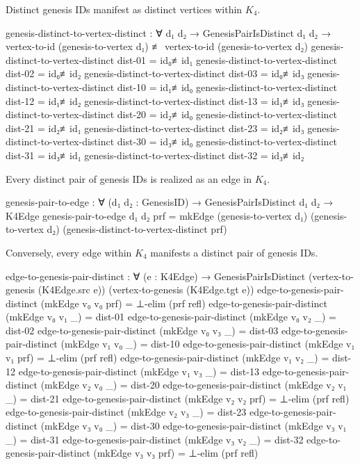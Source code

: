 \documentclass[11pt,a4paper]{book}
\begin{document}
Distinct genesis IDs manifest as distinct vertices within $K_4$.

\begin{code}
genesis-distinct-to-vertex-distinct : ∀ {d₁ d₂} → GenesisPairIsDistinct d₁ d₂ → 
  vertex-to-id (genesis-to-vertex d₁) ≢ vertex-to-id (genesis-to-vertex d₂)
genesis-distinct-to-vertex-distinct dist-01 = id₀≢id₁
genesis-distinct-to-vertex-distinct dist-02 = id₀≢id₂
genesis-distinct-to-vertex-distinct dist-03 = id₀≢id₃
genesis-distinct-to-vertex-distinct dist-10 = id₁≢id₀
genesis-distinct-to-vertex-distinct dist-12 = id₁≢id₂
genesis-distinct-to-vertex-distinct dist-13 = id₁≢id₃
genesis-distinct-to-vertex-distinct dist-20 = id₂≢id₀
genesis-distinct-to-vertex-distinct dist-21 = id₂≢id₁
genesis-distinct-to-vertex-distinct dist-23 = id₂≢id₃
genesis-distinct-to-vertex-distinct dist-30 = id₃≢id₀
genesis-distinct-to-vertex-distinct dist-31 = id₃≢id₁
genesis-distinct-to-vertex-distinct dist-32 = id₃≢id₂

\end{code}

Every distinct pair of genesis IDs is realized as an edge in $K_4$.

\begin{code}
genesis-pair-to-edge : ∀ (d₁ d₂ : GenesisID) → GenesisPairIsDistinct d₁ d₂ → K4Edge
genesis-pair-to-edge d₁ d₂ prf = 
  mkEdge (genesis-to-vertex d₁) (genesis-to-vertex d₂) (genesis-distinct-to-vertex-distinct prf)

\end{code}

Conversely, every edge within $K_4$ manifests a distinct pair of genesis IDs.

\begin{code}
edge-to-genesis-pair-distinct : ∀ (e : K4Edge) → 
  GenesisPairIsDistinct (vertex-to-genesis (K4Edge.src e)) (vertex-to-genesis (K4Edge.tgt e))
edge-to-genesis-pair-distinct (mkEdge v₀ v₀ prf) = ⊥-elim (prf refl)
edge-to-genesis-pair-distinct (mkEdge v₀ v₁ _) = dist-01
edge-to-genesis-pair-distinct (mkEdge v₀ v₂ _) = dist-02
edge-to-genesis-pair-distinct (mkEdge v₀ v₃ _) = dist-03
edge-to-genesis-pair-distinct (mkEdge v₁ v₀ _) = dist-10
edge-to-genesis-pair-distinct (mkEdge v₁ v₁ prf) = ⊥-elim (prf refl)
edge-to-genesis-pair-distinct (mkEdge v₁ v₂ _) = dist-12
edge-to-genesis-pair-distinct (mkEdge v₁ v₃ _) = dist-13
edge-to-genesis-pair-distinct (mkEdge v₂ v₀ _) = dist-20
edge-to-genesis-pair-distinct (mkEdge v₂ v₁ _) = dist-21
edge-to-genesis-pair-distinct (mkEdge v₂ v₂ prf) = ⊥-elim (prf refl)
edge-to-genesis-pair-distinct (mkEdge v₂ v₃ _) = dist-23
edge-to-genesis-pair-distinct (mkEdge v₃ v₀ _) = dist-30
edge-to-genesis-pair-distinct (mkEdge v₃ v₁ _) = dist-31
edge-to-genesis-pair-distinct (mkEdge v₃ v₂ _) = dist-32
edge-to-genesis-pair-distinct (mkEdge v₃ v₃ prf) = ⊥-elim (prf refl)

\end{code}
\end{document}
